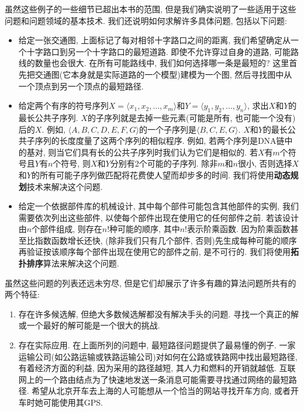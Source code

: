 \documentclass[oneside,10pt,fontset=none]{ctexbook}
\begin{document}
虽然这些例子的一些细节已超出本书的范围, 但是我们确实说明了一些适用于这些问题和问题领域的基本技术. 我们还说明如何求解许多具体问题, 包括以下问题:

\begin{itemize}
    \item 给定一张交通图, 上面标记了每对相邻十字路口之间的距离, 我们希望确定从一个十字路口到另一个十字路口的最短道路. 即使不允许穿过自身的道路, 可能路线的数量也会很大. 在所有可能路线中, 我们如何选择哪一条是最短的? 这里首先把交通图(它本身就是实际道路的一个模型)建模为一个图, 然后寻找图中从一个顶点到另一个顶点的最短路径.
    \item 给定两个有序的符号序列$X = \langle x_1, x_2, \dots, x_m\rangle$和$Y=\langle y_1, y_2, \dots, y_n\rangle$, 求出$X$和$Y$的最长公共子序列. $X$的子序列就是去掉一些元素(可能是所有, 也可能一个没有)后的$X$. 例如, $\langle A, B, C, D, E, F, G\rangle$的一个子序列是$\langle B, C, E, G\rangle$. $X$和$Y$的最长公共子序列的长度度量了这两个序列的相似程序. 例如, 若两个序列是DNA链中的基对, 则当它们具有长的公共子序列时我们认为它们是相似的. 若$X$有$m$个符号且$Y$有$n$个符号, 则$X$和$Y$分别有2个可能的子序列. 除非$m$和$n$很小, 否则选择$X$和$Y$的所有可能子序列做匹配将花费使人望而却步多的时间. 我们将使用\textbf{动态规划}技术来解决这个问题.
    \item 给定一个依据部件库的机械设计, 其中每个部件可能包含其他部件的实例, 我们需要依次列出这些部件, 以使每个部件出现在使用它的任何部件之前. 若该设计由$n$个部件组成, 则存在$n!$种可能的顺序, 其中$n!$表示阶乘函数. 因为阶乘函数甚至比指数函数增长还快, (除非我们只有几个部件, 否则)先生成每种可能的顺序再验证按该顺序每个部件出现在使用它的部件之前, 是不可行的. 我们将使用\textbf{拓扑排序}算法来解决这个问题.
\end{itemize}

虽然这些问题的列表还远未穷尽, 但是它们却展示了许多有趣的算法问题所共有的两个特征:

\begin{enumerate}
    \item 存在许多候选解, 但绝大多数候选解都没有解决手头的问题. 寻找一个真正的解或一个最好的解可能是一个很大的挑战.
    \item 存在实际应用. 在上面所列的问题中, 最短路径问题提供了最易懂的例子. 一家运输公司(如公路运输或铁路运输公司)对如何在公路或铁路网中找出最短路径, 有着经济方面的利益, 因为采用的路径越短, 其人力和燃料的开销就越低. 互联网上的一个路由结点为了快速地发送一条消息可能需要寻找通过网络的最短路径. 希望从北京开车去上海的人可能想从一个恰当的网站寻找开车方向, 或者开车时她可能使用其GPS.
\end{enumerate}
\end{document}
